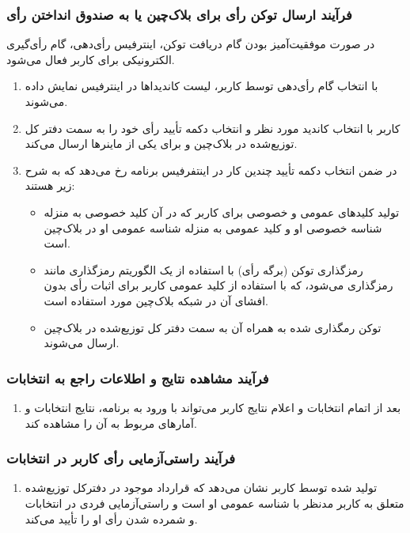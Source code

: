 \documentclass[12pt]{article}
\begin{document}
\subsubsection{فرآیند ارسال توکن رأی برای بلاک‌چین یا به صندوق انداختن رأی}
در صورت موفقیت‌آمیز بودن گام دریافت توکن، اینترفیس رأی‌دهی، گام رأی‌گیری الکترونیکی برای کاربر فعال می‌شود.   
\begin{enumerate}[label=(\arabic*)]
\item
با انتخاب گام رأی‌دهی توسط کاربر، لیست کاندیداها در اینترفیس نمایش داده می‌شوند.
\item
کاربر با انتخاب کاندید مورد نظر و انتخاب دکمه تأیید رأی خود را به سمت دفتر کل توزیع‌شده در بلاک‌چین و برای یکی از ماینرها ارسال می‌کند. 
\item
در ضمن انتخاب دکمه تأیید چندین کار در اینتفرفیس برنامه رخ می‌دهد که به شرح زیر هستند:
\begin{itemize}
\item
تولید کلیدهای عمومی و خصوصی برای کاربر که در آن کلید خصوصی به منزله شناسه خصوصی او و کلید عمومی به منزله شناسه عمومی او در بلاک‌چین است. 
\item
رمزگذاری توکن (برگه رأی) با استفاده از یک الگوریتم رمزگذاری مانند 
رمزگذاری می‌شود، که با استفاده از کلید عمومی کاربر برای  اثبات رأی بدون افشای آن در شبکه بلاک‌چین مورد استفاده است. 
\item
توکن رمگذاری شده به همراه  
آن به سمت دفتر کل توزیع‌شده در بلاک‌چین ارسال می‌شوند. 
\end{itemize}
\end{enumerate}



\subsubsection{فرآیند مشاهده نتایج و اطلاعات راجع به انتخابات}
\begin{enumerate}[label=(\arabic*)]
\item
بعد از اتمام انتخابات و اعلام نتایج کاربر می‌تواند با ورود به برنامه، نتایج انتخابات و آمارهای مربوط به آن را مشاهده کند. 
\end{enumerate}



\subsubsection{فرآیند راستی‌آزمایی رأی کاربر در انتخابات}
\begin{enumerate}[label=(\arabic*)]
\item
{} 
تولید شده توسط کاربر نشان می‌دهد که قرارداد موجود در دفترکل توزیع‌شده متعلق به کاربر مدنظر با شناسه عمومی او است و راستی‌آزمایی فردی در انتخابات و شمرده شدن رأی او را تأیید می‌کند. 
\end{enumerate}
\end{document}
